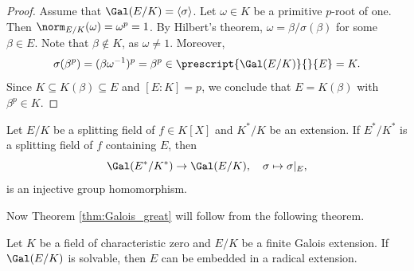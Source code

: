 \begin{proof}
    Assume that $\Gal(E/K)=\langle\sigma\rangle$. 
    Let $\omega\in K$ be a primitive $p$-root of one. Then $\norm_{E/K}(\omega)=\omega^p=1$. By Hilbert's theorem, 
    $\omega=\beta/\sigma(\beta)$ for some $\beta\in E$. Note that $\beta\not\in K$, as $\omega\ne1$. Moreover, 
    \[
    \sigma(\beta^p)=(\beta\omega^{-1})^p=\beta^p\in\prescript{\Gal(E/K)}{}{E}=K.
    \]
    Since $K\subseteq K(\beta)\subseteq E$ and $[E:K]=p$, we conclude that $E=K(\beta)$ with $\beta^p\in K$. 
\end{proof}

\begin{exercise}
\label{xca:embedding}
    Let $E/K$ be a splitting field of $f\in K[X]$ and $K^*/K$ be an extension.
    If $E^*/K^*$ is a splitting field of $f$ containing $E$, then 
    \[
    \Gal(E^*/K^*)\to\Gal(E/K),\quad \sigma\mapsto\sigma|_{E},
    \]
    is an injective group homomorphism. 
\end{exercise}

Now Theorem \ref{thm:Galois_great} will follow from the following theorem. 

\begin{theorem}
    Let $K$ be a field of characteristic zero and $E/K$ be a finite Galois extension.
    If $\Gal(E/K)$ is solvable, then $E$ can be embedded in a radical extension. 
\end{theorem}

